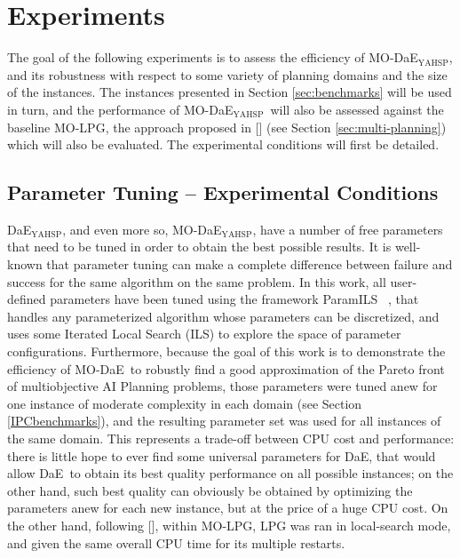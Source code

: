 \documentclass[letterpaper]{article}
\def\DAE{{\sc DaE}}
\newcommand{\DAEYAHSP}{{\sc DaE$_{\text{YAHSP}}$}}
\def\MODAE{{\sc MO-DaE}}
\newcommand{\MODAEYAHSP}{{\sc MO-DaE$_{\text{YAHSP}}$}}
\newcommand{\MOLPG}{{\sc MO-LPG}}
\def\PARAMILS{{\sc ParamILS}}
\begin{document}
\section{Experiments}
\label{sec:experiments}

The goal of the following experiments is to assess the efficiency of \MODAEYAHSP, and its robustness with respect to some variety of planning domains and the size of the instances. The instances presented in Section \ref{sec:benchmarks} will be used in turn, and the performance of \MODAEYAHSP\ will also be assessed against the baseline \MOLPG, the approach proposed in \citeauthor{LPG-PlanSIG2012} [\citeyear{LPG-PlanSIG2012}] (see Section \ref{sec:multi-planning}) which will also be evaluated. The experimental conditions will first be detailed.


\subsection{Parameter Tuning -- Experimental Conditions}
\label{sec:conditions}

\DAEYAHSP, and even more so, \MODAEYAHSP, have a number of free parameters that need to be tuned in order to obtain the best possible results. It is well-known that parameter tuning can make a complete difference between failure and success for the same algorithm on the same problem. In this work, all user-defined parameters have been tuned using the  framework \PARAMILS\
\cite{ParamILS-JAIR}, that handles any parameterized algorithm whose parameters can be discretized, and uses some Iterated Local Search (ILS) to explore the space of parameter configurations.
Furthermore, because the goal of this work is to demonstrate the efficiency of \MODAE\ to robustly find a good approximation of the Pareto front of multiobjective AI Planning problems, those parameters were tuned anew for one instance of moderate complexity in each domain (see Section \ref{IPCbenchmarks}), and the resulting parameter set was used for all instances of the same domain. This represents a trade-off between CPU cost and performance: there is little hope to ever find some universal parameters for \DAE, that would allow \DAE\ to obtain its best quality performance on all possible instances; on the other hand, such best quality can obviously be obtained by optimizing the parameters anew for each new instance, but at the price of a huge CPU cost. On the other hand, following \citeauthor{LPG-PlanSIG2012} [\citeyear{LPG-PlanSIG2012}], within \MOLPG, LPG was ran in local-search mode, and given the same overall CPU time for its multiple restarts.
\end{document}
